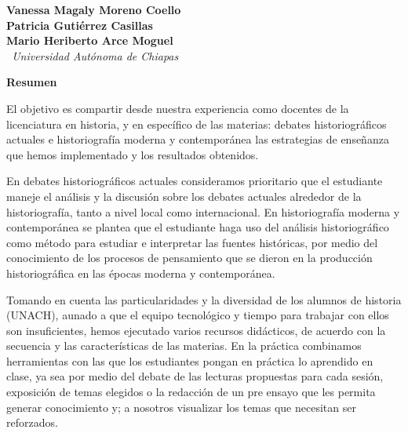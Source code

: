 %

\thispagestyle{empty}
{\par}
\setcounter{footnote}{0}


\bigskip
\begin{center}
{\bfseries Vanessa Magaly Moreno Coello\\
Patricia Gutiérrez Casillas\\
Mario Heriberto Arce Moguel}\\
{\itshape\ Universidad Autónoma de Chiapas\/} 
\end{center}

\bigskip
{\bfseries Resumen}

El objetivo es compartir desde nuestra experiencia como docentes de la 
licenciatura en historia, y en específico de las materias: debates 
historiográficos actuales e historiografía moderna y contemporánea las 
estrategias de enseñanza que hemos implementado y los resultados 
obtenidos. 


En debates historiográficos actuales consideramos prioritario que el 
estudiante maneje el análisis y la discusión sobre los debates actuales 
alrededor de la historiografía, tanto a nivel local como internacional. 
En historiografía moderna y contemporánea se plantea que el estudiante 
haga uso del análisis historiográfico como método para estudiar e 
interpretar las fuentes históricas, por medio del conocimiento de los 
procesos de pensamiento que se dieron en la producción historiográfica 
en las épocas moderna y contemporánea.


Tomando en cuenta las particularidades y la diversidad de los alumnos 
de historia (UNACH), aunado a que el equipo tecnológico y tiempo para 
trabajar con ellos son insuficientes, hemos ejecutado varios recursos 
didácticos, de acuerdo con la secuencia y las características de las 
materias. En la práctica combinamos herramientas con las que los 
estudiantes pongan en práctica lo aprendido en clase, ya sea por medio 
del debate de las lecturas propuestas para cada sesión, exposición de 
temas elegidos o la redacción de un pre ensayo que les permita generar 
conocimiento y; a nosotros visualizar los temas que necesitan ser 
reforzados. 

